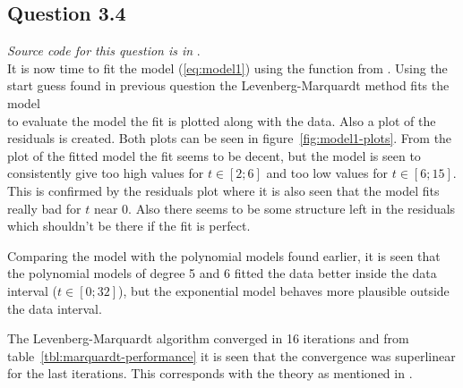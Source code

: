 \subsection*{Question 3.4}
\textit{Source code for this question is in }. \\
It is now time to fit the model (\ref{eq:model1}) using the  function from . Using the start guess found in previous question the Levenberg-Marquardt method fits the model
\begin{equation*}
    
\end{equation*}
to evaluate the model the fit is plotted along with the data. Also a plot of the residuals is created. Both plots can be seen in figure~\ref{fig:model1-plots}. From the plot of the fitted model the fit seems to be decent, but the model is seen to consistently give too high values for $t\in[2;6]$ and too low values for $t\in[6; 15]$. This is confirmed by the residuals plot where it is also seen that the model fits really bad for $t$ near 0. Also there seems to be some structure left in the residuals which shouldn't be there if the fit is perfect. \par
Comparing the model with the polynomial models found earlier, it is seen that the polynomial models of degree 5 and 6 fitted the data better inside the data interval ($t\in[0; 32]$), but the exponential model behaves more plausible outside the data interval.\par
The Levenberg-Marquardt algorithm converged in 16 iterations and from table~\ref{tbl:marquardt-performance} it is seen that the convergence was superlinear for the last iterations. This corresponds with the theory as mentioned in \cite[p. 262]{nocedal06}.

